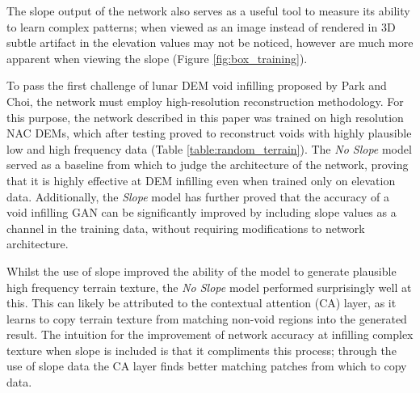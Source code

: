 \documentclass[twocolumn]{article}
\begin{document}
The slope output of the network also serves as a useful tool to measure its ability to learn complex patterns; when viewed as an image instead of rendered in 3D subtle artifact in the elevation values may not be noticed, however are much more apparent when viewing the slope (Figure \ref{fig:box_training}).

To pass the first challenge of lunar DEM void infilling proposed by Park and Choi\autocite{parkNeuralProcessApproach2021}, the network must employ high-resolution reconstruction methodology.
For this purpose, the network described in this paper was trained on high resolution NAC DEMs, which after testing proved to reconstruct voids with highly plausible low and high frequency data (Table \ref{table:random_terrain}).
The \emph{No Slope} model served as a baseline from which to judge the architecture of the network, proving that it is highly effective at DEM infilling even when trained only on elevation data.
Additionally, the \emph{Slope} model has further proved that the accuracy of a void infilling GAN can be significantly improved by including slope values as a channel in the training data, without requiring modifications to network architecture.

Whilst the use of slope improved the ability of the model to generate plausible high frequency terrain texture, the \emph{No Slope} model performed surprisingly well at this.
This can likely be attributed to the contextual attention (CA) layer, as it learns to copy terrain texture from matching non-void regions into the generated result.
The intuition for the improvement of network accuracy at infilling complex texture when slope is included is that it compliments this process; through the use of slope data the CA layer finds better matching patches from which to copy data.
\end{document}

